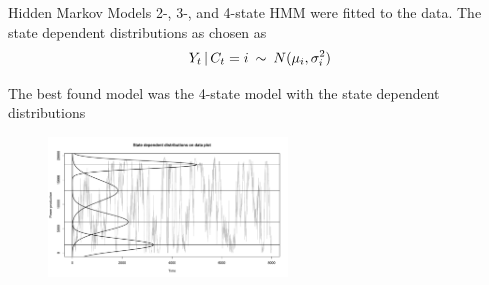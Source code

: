 \begin{frame}{Hidden Markov Models}
    2-, 3-, and 4-state HMM were fitted to the data. The state dependent distributions as chosen as
    \begin{equation*}
        Y_t\,|\, C_t=i\:\sim\: N(\mu_i, \sigma_i^2)
    \end{equation*}
    
    The best found model was the 4-state model with the state dependent distributions

    \begin{figure}
    \includegraphics[width=240px]{../plots/4-state-normal-dist-plot.pdf}
    \end{figure}
\end{frame}

